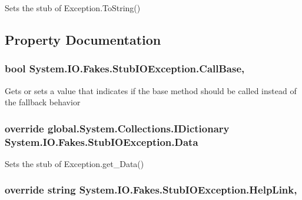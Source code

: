 Sets the stub of Exception.\-To\-String()



\subsection{Property Documentation}
\hypertarget{class_system_1_1_i_o_1_1_fakes_1_1_stub_i_o_exception_a34db4d6d4883a46ec708225b74ab1ac6}{
\subsubsection[{Call\-Base}]{\setlength{\rightskip}{0pt plus 5cm}bool System.\-I\-O.\-Fakes.\-Stub\-I\-O\-Exception.\-Call\-Base\hspace{0.3cm}{\ttfamily [get]}, {\ttfamily [set]}}}\label{class_system_1_1_i_o_1_1_fakes_1_1_stub_i_o_exception_a34db4d6d4883a46ec708225b74ab1ac6}


Gets or sets a value that indicates if the base method should be called instead of the fallback behavior

\hypertarget{class_system_1_1_i_o_1_1_fakes_1_1_stub_i_o_exception_aea1af9f046bfe2a92341ed54c44ac973}{
\subsubsection[{Data}]{\setlength{\rightskip}{0pt plus 5cm}override global.\-System.\-Collections.\-I\-Dictionary System.\-I\-O.\-Fakes.\-Stub\-I\-O\-Exception.\-Data\hspace{0.3cm}{\ttfamily [get]}}}\label{class_system_1_1_i_o_1_1_fakes_1_1_stub_i_o_exception_aea1af9f046bfe2a92341ed54c44ac973}


Sets the stub of Exception.\-get\-\_\-\-Data()

\hypertarget{class_system_1_1_i_o_1_1_fakes_1_1_stub_i_o_exception_aba74f05c68b48403843a7fd3eda63e37}{
\subsubsection[{Help\-Link}]{\setlength{\rightskip}{0pt plus 5cm}override string System.\-I\-O.\-Fakes.\-Stub\-I\-O\-Exception.\-Help\-Link\hspace{0.3cm}{\ttfamily [get]}, {\ttfamily [set]}}}\label{class_system_1_1_i_o_1_1_fakes_1_1_stub_i_o_exception_aba74f05c68b48403843a7fd3eda63e37}


